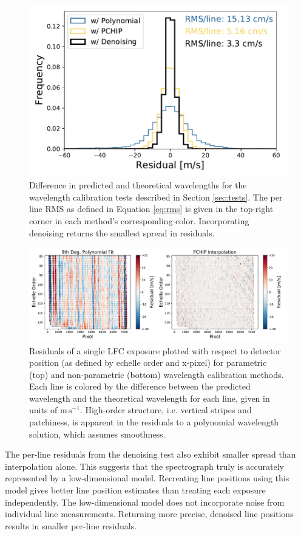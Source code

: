 \documentclass[twocolumn,table,xcolor,trackchanges]{aastex63}
\newcommand{\mps}{\mathrm{m\,s^{-1}}}
\begin{document}
\begin{figure}[b]
\centering
\includegraphics[width=.45\textwidth]{Figures/all_results.pdf}
\caption{Difference in predicted and theoretical wavelengths for the wavelength calibration tests described in Section \ref{sec:tests}.  The per line RMS as defined in Equation \ref{eq:rms} is given in the top-right corner in each method's corresponding color.  Incorporating denoising returns the smallest spread in residuals.}
\label{fig:testHists}
\end{figure} 

\begin{figure}[t]
\centering
\includegraphics[width=\textwidth]{Figures/lineResids2D.pdf}
\caption{Residuals of a single LFC exposure plotted with respect to detector position (as defined by echelle order and x-pixel) for parametric (top) and non-parametric (bottom) wavelength calibration methods.  Each line is colored by the difference between the predicted wavelength and the theoretical wavelength for each line, given in units of $\mps$.  High-order structure, i.e. vertical stripes and patchiness, is apparent in the residuals to a polynomial wavelength solution, which assumes smoothness.}
\label{fig:resid2d}
\end{figure}

The per-line residuals from the denoising test also exhibit smaller spread than interpolation alone.  This suggests that the spectrograph truly is accurately represented by a low-dimensional model.  Recreating line positions using this model gives better line position estimates than treating each exposure independently.  The low-dimensional model does not incorporate noise from individual line measurements.  Returning more precise, denoised line positions results in smaller per-line residuals.
\end{document}
